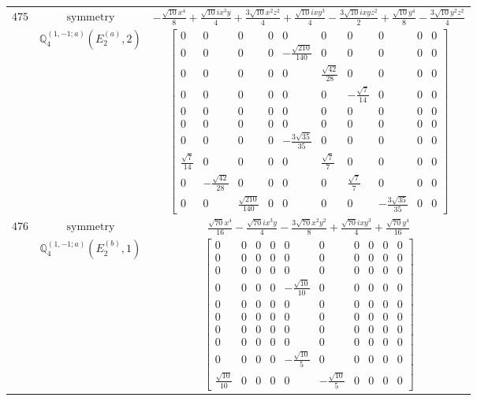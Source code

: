 \documentclass[fleqn,8pt,landscape]{jsarticle}
\begin{document}
\begin{longtable}{ccc}
$ 475 $ & $ \text{symmetry} $ & $ - \frac{\sqrt{10} x^{4}}{8} + \frac{\sqrt{10} i x^{3} y}{4} + \frac{3 \sqrt{10} x^{2} z^{2}}{4} + \frac{\sqrt{10} i x y^{3}}{4} - \frac{3 \sqrt{10} i x y z^{2}}{2} + \frac{\sqrt{10} y^{4}}{8} - \frac{3 \sqrt{10} y^{2} z^{2}}{4} $ \\
$  $ & $ \mathbb{Q}_{4}^{(1,-1;a)}(E_{2}^{(a)},2) $ & $ \begin{bmatrix} 0 & 0 & 0 & 0 & 0 & 0 & 0 & 0 & 0 & 0 \\ 0 & 0 & 0 & 0 & - \frac{\sqrt{210}}{140} & 0 & 0 & 0 & 0 & 0 \\ 0 & 0 & 0 & 0 & 0 & \frac{\sqrt{42}}{28} & 0 & 0 & 0 & 0 \\ 0 & 0 & 0 & 0 & 0 & 0 & - \frac{\sqrt{7}}{14} & 0 & 0 & 0 \\ 0 & 0 & 0 & 0 & 0 & 0 & 0 & 0 & 0 & 0 \\ 0 & 0 & 0 & 0 & 0 & 0 & 0 & 0 & 0 & 0 \\ 0 & 0 & 0 & 0 & - \frac{3 \sqrt{35}}{35} & 0 & 0 & 0 & 0 & 0 \\ \frac{\sqrt{7}}{14} & 0 & 0 & 0 & 0 & \frac{\sqrt{7}}{7} & 0 & 0 & 0 & 0 \\ 0 & - \frac{\sqrt{42}}{28} & 0 & 0 & 0 & 0 & \frac{\sqrt{7}}{7} & 0 & 0 & 0 \\ 0 & 0 & \frac{\sqrt{210}}{140} & 0 & 0 & 0 & 0 & - \frac{3 \sqrt{35}}{35} & 0 & 0 \end{bmatrix} $ \\ \hline
$ 476 $ & $ \text{symmetry} $ & $ \frac{\sqrt{70} x^{4}}{16} - \frac{\sqrt{70} i x^{3} y}{4} - \frac{3 \sqrt{70} x^{2} y^{2}}{8} + \frac{\sqrt{70} i x y^{3}}{4} + \frac{\sqrt{70} y^{4}}{16} $ \\
$  $ & $ \mathbb{Q}_{4}^{(1,-1;a)}(E_{2}^{(b)},1) $ & $ \begin{bmatrix} 0 & 0 & 0 & 0 & 0 & 0 & 0 & 0 & 0 & 0 \\ 0 & 0 & 0 & 0 & 0 & 0 & 0 & 0 & 0 & 0 \\ 0 & 0 & 0 & 0 & 0 & 0 & 0 & 0 & 0 & 0 \\ 0 & 0 & 0 & 0 & - \frac{\sqrt{10}}{10} & 0 & 0 & 0 & 0 & 0 \\ 0 & 0 & 0 & 0 & 0 & 0 & 0 & 0 & 0 & 0 \\ 0 & 0 & 0 & 0 & 0 & 0 & 0 & 0 & 0 & 0 \\ 0 & 0 & 0 & 0 & 0 & 0 & 0 & 0 & 0 & 0 \\ 0 & 0 & 0 & 0 & 0 & 0 & 0 & 0 & 0 & 0 \\ 0 & 0 & 0 & 0 & - \frac{\sqrt{10}}{5} & 0 & 0 & 0 & 0 & 0 \\ \frac{\sqrt{10}}{10} & 0 & 0 & 0 & 0 & - \frac{\sqrt{10}}{5} & 0 & 0 & 0 & 0 \end{bmatrix} $ \\ \hline

\end{longtable}
\end{document}
